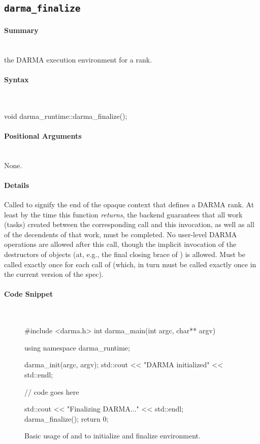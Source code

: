 
\subsection{\texttt{darma\_finalize}}
\label{ssec:api_fe_finalize}

\paragraph{Summary}\mbox{}\\
 the DARMA execution environment for a \gls{rank}.

\paragraph{Syntax}\mbox{}\\ 
\begin{CppCode}
void darma_runtime::darma_finalize();
\end{CppCode}

\paragraph{Positional Arguments}\mbox{} \\
None. 

\paragraph{Details}\mbox{} 
Called to signify the end of the \gls{opaque context} that defines a DARMA
\gls{rank}.  At
least by the time this function {\em returns}, the backend guarantees that all work
(tasks) created between the corresponding  call and this
invocation, as well as all of the decendents of that work, must be
completed.  No user-level DARMA operations are allowed after this call, though
the implicit invocation of the destructors of  objects
(at, e.g., the final closing brace of ) is allowed.  Must
be called exactly once for each call of  (which, in turn
must be called exactly once in the current version of the spec).

\paragraph{Code Snippet}\mbox{} \\
\begin{figure}[!h]
\begin{CppCodeNumb}
#include <darma.h>
int darma_main(int argc, char** argv)
{
  using namespace darma_runtime;

  darma_init(argc, argv);
  std::cout << "DARMA initialized" << std::endl;

  // code goes here

  std::cout << "Finalizing DARMA..." << std::endl;
  darma_finalize();
  return 0;
}
\end{CppCodeNumb}
\caption{Basic usage of \protect{} and \protect{} 
to initialize and finalize environment.}
\label{fig:fe_api_init}
\end{figure}

